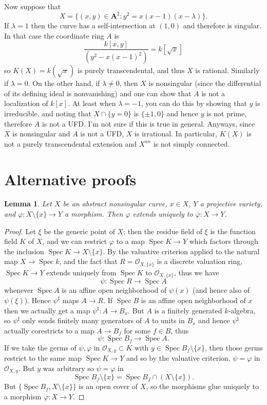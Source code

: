 \documentclass[reqno,12pt,letterpaper]{amsart}
\newcommand{\Aff}{\mathbf A}
\DeclareMathOperator{\Spec}{Spec}
\newcommand{\Olo}{\mathscr O}
\newtheorem{lemma}[theorem]{Lemma}
\theoremstyle{definition}
\begin{document}
Now suppose that
$$X = \{(x, y) \in \Aff^2: y^2 = x(x - 1)(x - \lambda)\}.$$
If $\lambda = 1$ then the curve has a self-intersection at $(1, 0)$ and therefore is singular. In that case the coordinate ring $A$ is
$$\frac{k[x, y]}{(y^2 - x(x-1)^2)} = k[\sqrt x]$$
so $K(X) = k(\sqrt x)$ is purely transcendental, and thus $X$ is rational. Similarly if $\lambda = 0$.
On the other hand, if $\lambda \neq 0$, then $X$ is nonsingular (since the differential of its defining ideal is nonvanishing) and one can show that $A$ is not a localization of $k[x]$.
At least when $\lambda = -1$, you can do this by showing that $y$ is irreducible, and noting that $X \cap \{y = 0\}$ is $\{\pm 1, 0\}$ and hence $y$ is not prime, therefore $A$ is not a UFD. I'm not sure if this is true in general.
Anyways, since $X$ is nonsingular and $A$ is not a UFD, $X$ is irrational.
In particular, $K(X)$ is not a purely transcendental extension and $X^{an}$ is not simply connected.

\appendix
\section{Alternative proofs}
\begin{lemma}
Let $X$ be an abstract nonsingular curve, $x \in X$, $Y$ a projective variety, and $\varphi: X \setminus \{x\} \to Y$ a morphism.
Then $\varphi$ extends uniquely to $\overline \varphi: X \to Y$.
\end{lemma}
\begin{proof}
Let $\xi$ be the generic point of $X$; then the residue field of $\xi$ is the function field $K$ of $X$, and we can restrict $\varphi$ to a map $\Spec K \to Y$
which factors through the inclusion $\Spec K \to X \setminus \{x\}$.
By the valuative criterion applied to the natural map $X \to \Spec k$, and the fact that $R = \Olo_{X, \{x\}}$ is a discrete valuation ring, $\Spec K \to Y$ extends uniquely from $\Spec K$ to $\Olo_{X,\{x\}}$, thus we have
$$\psi: \Spec R \to \Spec A$$
whenever $\Spec A$ is an affine open neighborhood of $\psi(x)$ (and hence also of $\psi(\xi)$). Hence $\psi^\sharp$ maps $A \to R$.
If $\Spec B$ is an affine open neighborhood of $x$ then we actually get a map $\psi^\sharp: A \to B_x$.
But $A$ is a finitely generated $k$-algebra, so $\psi^\sharp$ only sends finitely many generators of $A$ to units in $B_x$ and hence $\psi^\sharp$ actually corestricts to a map $A \to B_f$ for some $f \in B$, thus
$$\psi: \Spec B_f \to \Spec A.$$
If we take the germs of $\psi,\varphi$ in $\Olo_{X, y} \subset K$ with $y \in \Spec B_f\setminus \{x\}$, then those germs restrict to the same map $\Spec K \to Y$ and so by the valuative criterion, $\psi = \varphi$ in $\Olo_{X, y}$.
But $y$ was arbitrary so $\psi = \varphi$ in
$$\Spec B_f \setminus\{x\} = \Spec B_f \cap (X \setminus \{x\}).$$
But $\{\Spec B_f, X \setminus \{x\}\}$ is an open cover of $X$, so the morphisms glue uniquely to a morphism $\overline \varphi: X \to Y$.
\end{proof}




\printbibliography
\end{document}
